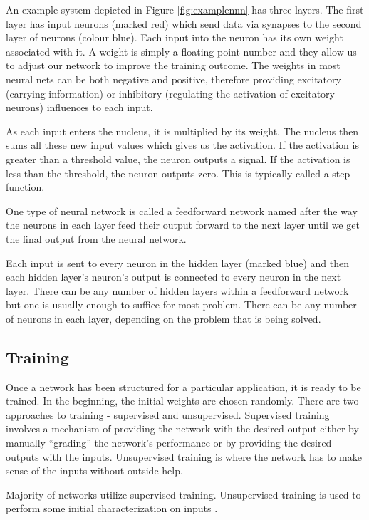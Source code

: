 An example system depicted in Figure \ref{fig:examplennn} has three layers. The first layer has input neurons (marked red) which send data via synapses to the second layer of neurons (colour blue). Each input into the neuron has its own weight associated with it. A weight is simply a floating point number and they allow us to adjust our network to improve the training outcome. The weights in most neural nets can be both negative and positive, therefore providing excitatory (carrying information) or inhibitory (regulating the activation of excitatory neurons) influences to each input. 

As each input enters the nucleus, it is multiplied by its weight. The nucleus then sums all these new input values which gives us the activation. If the activation is greater than a threshold value, the neuron outputs a signal. If the activation is less than the threshold, the neuron outputs zero. This is typically called a step function.

One type of neural network is called a feedforward network named after the way the neurons in each layer feed their output forward to the next layer until we get the final output from the neural network. 
 
Each input is sent to every neuron in the hidden layer (marked blue) and then each hidden layer’s neuron’s output is connected to every neuron in the next layer. There can be any number of hidden layers within a feedforward network but one is usually enough to suffice for most problem. There can be any number of neurons in each layer, depending on the problem that is being solved.

\vspace{10pt}

\subsection{Training}
Once a network has been structured for a particular application, it is ready to be trained. In the beginning, the initial weights are chosen randomly. 
There are two approaches to training - supervised and unsupervised. Supervised training involves a mechanism of providing the network with the desired output either by manually ``grading'' the network's performance or by providing the desired outputs with the inputs. Unsupervised training is where the network has to make sense of the inputs without outside help.

Majority of networks utilize supervised training. Unsupervised training is used to perform some initial characterization on inputs \cite{mostcommon}.

